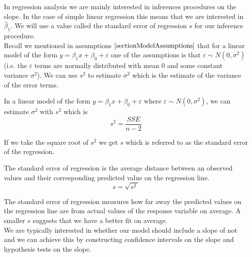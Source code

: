 In regression analysis we are mainly interested in 
inferences procedures on the slope.
In the case of simple linear regression this means
that we are interested in $\hat{\beta}_{1}$.
We will use a value called the
standard error of regression $s$ for our inference procedure.\\

Recall we mentioned in assumptions $\ref{sectionModelAssumptions}$
that for a linear model of the form $y = \beta_{1}x + \beta_{0} + \varepsilon$ 
one of the assumptions is that $\varepsilon \sim N(0, \sigma^{2})$
(i.e. the $\varepsilon$ terms are 
normally distributed with mean $0$ and some constant variance $\sigma^{2}$).
We can use $s^{2}$ to estimate $\sigma^{2}$ 
which is the estimate of the variance of the error terms.

\begin{definition}[$s^{2}$]	
In a linear model of the form $y = \beta_{1}x + \beta_{0} + \varepsilon$ 
where $\varepsilon \sim N(0, \sigma^{2})$,
we can estimate $\sigma^{2}$ with $s^{2}$ which is
	\begin{equation}
	s^{2} = \frac{SSE}{n-2}
	\end{equation}
\end{definition}
\hfill

If we take the square root of $s^{2}$ we get $s$ 
which is referred to as the 
standard error of the regression.

\begin{definition}
The standard error of regression is the average distance between an observed values 
and their corresponding predicted value on the regression line. 
	\begin{equation}
	s = \sqrt{s^{2}~}
	\end{equation}
\end{definition}
\hfill 

\noindent
The standard error of regression measures how far away the predicted values on the regression line
are from actual values of the response variable on average.
A smaller $s$ suggests that we have a better fit on average.\\

We are typically interested in whether our model should include a slope of not
and we can achieve this by constructing confidence intervals on the slope
and hypothesis tests on the slope.



